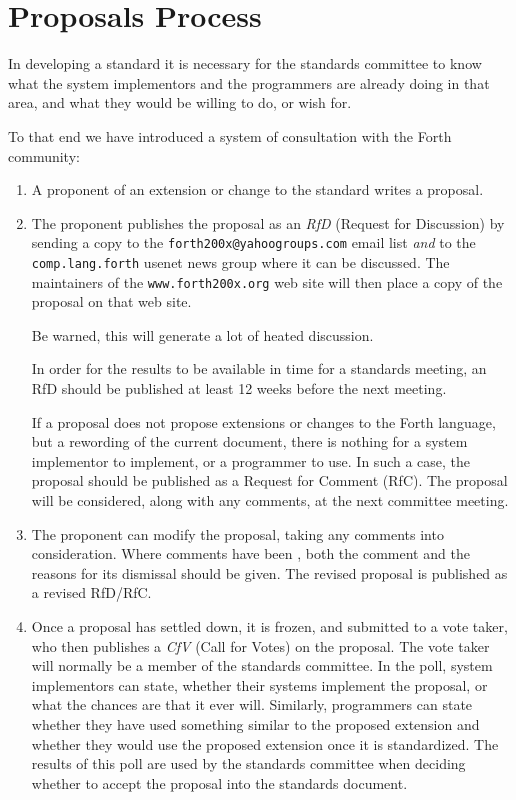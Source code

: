 
\chapter*{Proposals Process}
\label{process}

In developing a standard it is necessary for the standards committee to
know what the system implementors and the programmers are already doing
in that area, and what they would be willing to do, or wish for.

To that end we have introduced a system of consultation with the Forth
community:

\begin{enumerate}
\item
	A proponent of an extension or change to the standard writes a
	proposal.

\item
	The proponent publishes the proposal as an \emph{RfD} (Request for
	Discussion) by sending a copy to the \texttt{forth200x@yahoogroups.com}
	email list \emph{and} to the \texttt{comp.lang.forth} usenet news group
	where it can be discussed.  The maintainers of the
	\texttt{www.forth200x.org} web site will then place a copy of the
	proposal on that web site.

	Be warned, this will generate a lot of heated discussion.

	In order for the results to be available in time for a standards
	meeting, an RfD should be published at least 12 weeks before the
	next meeting.

	If a proposal does not propose extensions or changes to the Forth
	language, but a rewording of the current document, there is nothing
	for a system implementor to implement, or a programmer to use.  In
	such a case, the proposal should be published as a Request for Comment
	(RfC). The proposal will be considered, along with any comments, at
	the next committee meeting.

\item
	The proponent can modify the proposal, taking any comments into
	consideration.  Where comments have been
	,
	both the comment
	and the reasons for its dismissal should be given.  The revised
	proposal is published as a revised RfD/RfC.

\item
	Once a proposal has settled down, it is frozen, and submitted to a
	vote taker, who then publishes a \emph{CfV} (Call for Votes) on the
	proposal. The vote taker will normally be a member of the standards
	committee.  In the poll, system implementors can state, whether
	their systems implement the proposal, or what the chances are that
	it ever will.  Similarly, programmers can state whether they have
	used something similar to the proposed extension and whether they
	would use the proposed extension once it is standardized.  The
	results of this poll are used by the standards committee when
	deciding whether to accept the proposal into the standards document.


\end{enumerate}
